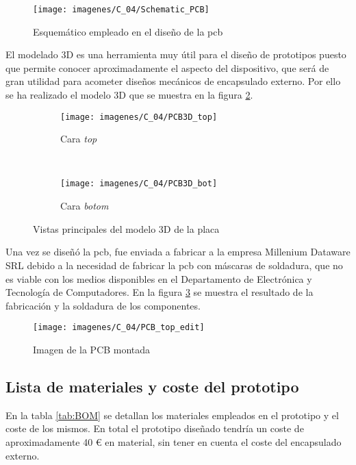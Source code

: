 \begin{figure}[!ht]
	\center
	\texttt{[image: imagenes/C\_04/Schematic\_PCB]}
	\caption{Esquemático empleado en el diseño de la \acrshort{pcb}}
	\label{fig:pcb_sch}
\end{figure}



El modelado 3D es una herramienta muy útil para el diseño de prototipos puesto que permite conocer aproximadamente el aspecto del dispositivo, que será de gran utilidad para acometer diseños mecánicos de encapsulado externo. Por ello se ha realizado el modelo 3D que se muestra en la figura \ref{fig:3D_Model}.

\begin{figure}[!ht]
\center
\begin{subfigure}[b]{0.6\textwidth}
\center
\texttt{[image: imagenes/C\_04/PCB3D\_top]}
\caption{Cara \textit{top}}
\end{subfigure}
\\
\begin{subfigure}[b]{0.6\textwidth}
\center
\texttt{[image: imagenes/C\_04/PCB3D\_bot]}
\caption{Cara \textit{botom}}
\end{subfigure}
\caption{Vistas principales del modelo 3D de la placa }
\label{fig:3D_Model}
\end{figure}

Una vez se diseñó la \acrshort{pcb}, fue enviada a fabricar a la empresa Millenium Dataware SRL \cite{mdsrl} debido a la necesidad de fabricar la \acrshort{pcb} con máscaras de soldadura, que no es viable con los medios disponibles en el Departamento de Electrónica y Tecnología de Computadores. En la figura \ref{fig:pcb_top} se muestra el resultado de la fabricación y la soldadura de los componentes.


 \begin{figure}[!ht]
	\center
	\texttt{[image: imagenes/C\_04/PCB\_top\_edit]}
	\caption{Imagen de la PCB montada }
	\label{fig:pcb_top}
\end{figure}



\subsection{Lista de materiales y coste del prototipo}

En la tabla \ref{tab:BOM} se detallan los materiales empleados en el prototipo y el coste de los mismos. En total el prototipo diseñado tendría un coste de aproximadamente 40 \euro \hspace{1mm} en material, sin tener en cuenta el coste del encapsulado externo.

